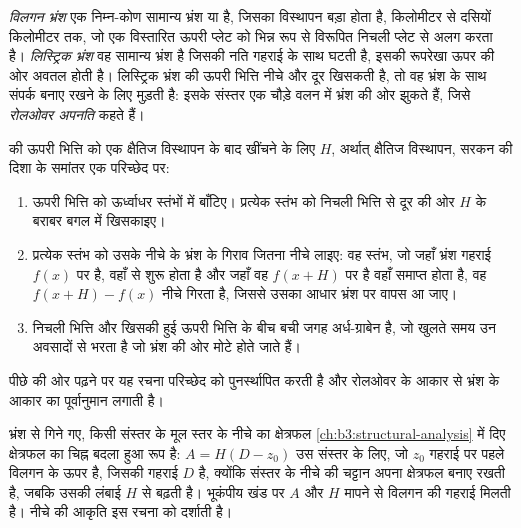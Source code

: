 \begin{definition}\label{def:b3:extension-strike-slip:detachment}
\emph{विलगन भ्रंश} एक निम्न-कोण सामान्य भ्रंश
या  है, जिसका विस्थापन बड़ा होता है, किलोमीटर से दसियों किलोमीटर तक, जो
एक विस्तारित ऊपरी प्लेट को भिन्न रूप से विरूपित निचली प्लेट से अलग करता है।
\emph{लिस्ट्रिक भ्रंश} वह सामान्य भ्रंश है जिसकी नति
गहराई के साथ घटती है, इसकी रूपरेखा ऊपर की ओर अवतल होती है। लिस्ट्रिक भ्रंश की
ऊपरी भित्ति नीचे और दूर खिसकती है, तो वह भ्रंश के साथ संपर्क बनाए रखने के लिए मुड़ती है:
इसके संस्तर एक चौड़े वलन में भ्रंश की ओर झुकते हैं, जिसे \emph{रोलओवर
अपनति} कहते हैं।
\end{definition}

\begin{method}[स्थिर क्षैतिज विस्थापन की रचना]\label{met:b3:extension-strike-slip:heave}
 की ऊपरी भित्ति को एक क्षैतिज विस्थापन के बाद खींचने के लिए
$H$, अर्थात् क्षैतिज विस्थापन, सरकन की दिशा के समांतर एक परिच्छेद पर:
\begin{enumerate}
  \item ऊपरी भित्ति को ऊर्ध्वाधर स्तंभों में बाँटिए। प्रत्येक स्तंभ को
        निचली भित्ति से दूर की ओर $H$ के बराबर बगल में खिसकाइए।
  \item प्रत्येक स्तंभ को उसके नीचे के भ्रंश के गिराव जितना नीचे लाइए: वह स्तंभ, जो
        जहाँ भ्रंश गहराई $f(x)$ पर है, वहाँ से शुरू होता है और जहाँ वह
        $f(x + H)$ पर है वहाँ समाप्त होता है, वह $f(x + H) - f(x)$ नीचे गिरता है, जिससे उसका आधार
        भ्रंश पर वापस आ जाए।
  \item निचली भित्ति और खिसकी हुई ऊपरी भित्ति के बीच बची जगह अर्ध-ग्राबेन है, जो
        खुलते समय उन अवसादों से भरता है जो भ्रंश की ओर
        मोटे होते जाते हैं।
\end{enumerate}
पीछे की ओर पढ़ने पर यह रचना परिच्छेद को पुनर्स्थापित करती है और
रोलओवर के आकार से भ्रंश के आकार का पूर्वानुमान लगाती है।
\end{method}

भ्रंश से गिने गए, किसी संस्तर के मूल स्तर के नीचे का क्षेत्रफल
\cref{ch:b3:structural-analysis} में दिए क्षेत्रफल का चिह्न बदला हुआ रूप है: $A =
H(D - z_0)$ उस संस्तर के लिए, जो $z_0$ गहराई पर पहले विलगन के ऊपर है, जिसकी
गहराई $D$ है, क्योंकि संस्तर के नीचे की चट्टान अपना क्षेत्रफल बनाए रखती है, जबकि उसकी लंबाई
$H$ से बढ़ती है। भूकंपीय खंड पर $A$ और $H$ मापने से विलगन की गहराई मिलती है।
नीचे की आकृति इस रचना को दर्शाती है।


